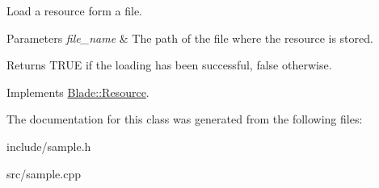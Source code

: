 Load a resource form a file. 


\begin{DoxyParams}{Parameters}
{\em file\+\_\+name} & The path of the file where the resource is stored. \\
\hline
\end{DoxyParams}
\begin{DoxyReturn}{Returns}
T\+R\+UE if the loading has been successful, false otherwise. 
\end{DoxyReturn}


Implements \hyperlink{class_blade_1_1_resource_ad89ab00a3b81df1338a8310ec92c5cff}{Blade\+::\+Resource}.



The documentation for this class was generated from the following files\+:\begin{DoxyCompactItemize}
\item 
include/sample.\+h\item 
src/sample.\+cpp\end{DoxyCompactItemize}
